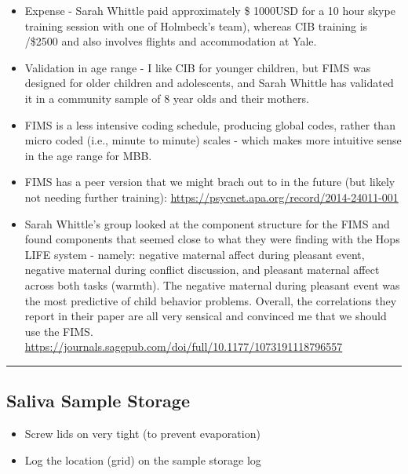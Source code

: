 \documentclass[]{book}
\providecommand{\tightlist}{%
  \setlength{\itemsep}{0pt}\setlength{\parskip}{0pt}}
\begin{document}
\begin{itemize}
  \begin{itemize}
  \tightlist
  \item
    Expense - Sarah Whittle paid approximately \$ 1000USD for a 10 hour skype training session with one of Holmbeck's team), whereas CIB training is /\$2500 and also involves flights and accommodation at Yale.
  \item
    Validation in age range - I like CIB for younger children, but FIMS was designed for older children and adolescents, and Sarah Whittle has validated it in a community sample of 8 year olds and their mothers.
  \item
    FIMS is a less intensive coding schedule, producing global codes, rather than micro coded (i.e., minute to minute) scales - which makes more intuitive sense in the age range for MBB.
  \item
    FIMS has a peer version that we might brach out to in the future (but likely not needing further training): \url{https://psycnet.apa.org/record/2014-24011-001}
  \item
    Sarah Whittle's group looked at the component structure for the FIMS and found components that seemed close to what they were finding with the Hops LIFE system - namely: negative maternal affect during pleasant event, negative maternal during conflict discussion, and pleasant maternal affect across both tasks (warmth). The negative maternal during pleasant event was the most predictive of child behavior problems. Overall, the correlations they report in their paper are all very sensical and convinced me that we should use the FIMS. \url{https://journals.sagepub.com/doi/full/10.1177/1073191118796557}
  \end{itemize}
\end{itemize}

\begin{center}\rule{0.5\linewidth}{0.5pt}\end{center}

\hypertarget{saliva-sample-storage}{%
\subsection{Saliva Sample Storage}\label{saliva-sample-storage}}

\begin{itemize}
\tightlist
\item
  Screw lids on very tight (to prevent evaporation)
\item
  Log the location (grid) on the sample storage log
\end{itemize}
\end{document}
